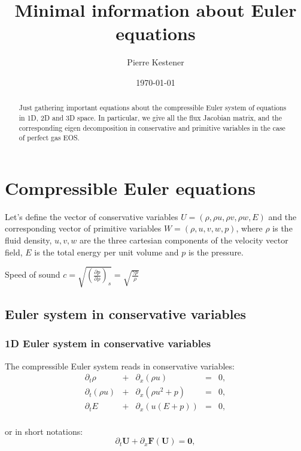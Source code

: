 \documentclass{article}
\title{Minimal information about Euler equations}
\author{Pierre Kestener}
\date{\today}
\begin{document}
\maketitle

\begin{abstract}
Just gathering important equations about the compressible Euler system of equations in 1D, 2D and 3D space. In particular, we give all the flux Jacobian matrix, and the corresponding eigen decomposition in conservative and primitive variables in the case of perfect gas EOS.
\end{abstract}

\section{Compressible Euler equations}

Let's define the vector of conservative variables $U=(\rho, \rho u, \rho v, \rho w, E)$ and the corresponding vector of primitive variables $W=(\rho, u, v, w, p)$, where $\rho$ is the fluid density, $u,v,w$ are the three cartesian components of the velocity vector field, $E$ is the total energy per unit volume and $p$ is the pressure.

Speed of sound $c=\sqrt{\left(\frac{\partial p}{\partial \rho}\right)_s} = \sqrt{\frac{\gamma p}{\rho}}$

\subsection{Euler system in conservative variables}

\subsubsection*{1D Euler system in conservative variables}
The compressible Euler system reads in conservative variables:\\
\begin{equation}
  \begin{array}{ccccc}
    \partial_t \rho & + & \partial_x(\rho u) & = & 0,\\
    \partial_t (\rho u) & + & \partial_x(\rho u^2+p) & = & 0,\\
    \partial_t E & + & \partial_x (u(E+p)) & = & 0,\\
  \end{array}
\end{equation}

or in short notations:
\begin{equation*}
  \partial_t \mathbf{U} + \partial_x \mathbf{F(U)} = \mathbf{0},
\end{equation*}
\end{document}
